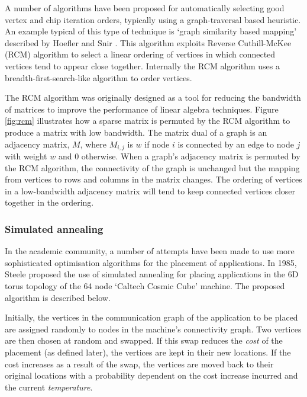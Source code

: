 				A number of algorithms have been proposed for automatically selecting
				good vertex and chip iteration orders, typically using a
				graph-traversal based heuristic. An example typical of this type of
				technique is `graph similarity based mapping' described by Hoefler and
				Snir \cite{hoefler11}. This algorithm exploits Reverse
				Cuthill-McKee (RCM) algorithm \cite{cuthill69} to select a linear
				ordering of vertices in which connected vertices tend to appear close
				together. Internally the RCM algorithm uses a breadth-first-search-like
				algorithm to order vertices.
				
				The RCM algorithm was originally designed as a tool for reducing the
				bandwidth of matrices to improve the performance of linear algebra
				techniques. Figure \ref{fig:rcm} illustrates how a sparse matrix is
				permuted by the RCM algorithm to produce a matrix with low bandwidth.
				The matrix dual of a graph is an adjacency matrix, $M$, where $M_{i,j}$
				is $w$ if node $i$ is connected by an edge to node $j$ with weight $w$
				and 0 otherwise. When a graph's adjacency matrix is permuted by the RCM
				algorithm, the connectivity of the graph is unchanged but the mapping
				from vertices to rows and columns in the matrix changes. The ordering
				of vertices in a low-bandwidth adjacency matrix will tend to keep
				connected vertices closer together in the ordering.
				
			\subsubsection{Simulated annealing}
				
				In the academic community, a number of attempts have been made to use
				more sophisticated optimisation algorithms for the placement of
				applications. In 1985, Steele \cite{steele85} proposed the use of
				simulated annealing for placing applications in the 6D torus topology
				of the 64 node `Caltech Cosmic Cube' machine. The proposed algorithm is
				described below.
				
				Initially, the vertices in the communication graph of the application
				to be placed are assigned randomly to nodes in the machine's
				connectivity graph. Two vertices are then chosen at random and swapped.
				If this swap reduces the \emph{cost} of the placement (as defined
				later), the vertices are kept in their new locations. If the cost
				increases as a result of the swap, the vertices are moved back to their
				original locations with a probability dependent on the cost increase
				incurred and the current \emph{temperature}.
				
